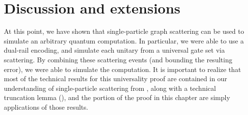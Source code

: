 \documentclass[../thesis-main/thesis-main]{subfiles}
\begin{document}
\begin{comment}
In particular, the fact that the initial state is efficiently preparable means that there exists a quantum circuit $\mathcal{C}_{\text{prep}}$ that prepares the given initial state from the state $\ket{0^n}$, possibly including some ancilla states.  Moreover, the quantum circuit only consists of $\poly(|x|)$ one- and two-qubit gates, since the state is efficiently preparable.  (Note that this bound depends on the efficiency of the given instance.)

From the initial state, we can then use \thm{Hamiltonian_simulation} to evaluate the quantum walk Hamiltonian for the time $T$.  Since the Hamiltonian is $d$-sparse, and since the Hamiltonian is an adjacency matrix, we have that its maximal eigenvalue is at most $d$.  Assuming that we want to perform the simulation with error $1/10$, we can then simulate the evolution of the quantum walk in an efficient manner.  (Again, the efficiency depends on the given instance.)

Finally, the quantum circuit can measure the state of the system in the vertex basis.  If the measured vertex belongs to $\mathcal{K}$ (a post-processing procedure that can be done efficiently), then the circuit accepts.  Otherwise, the circuit rejects.

As the quantum walker fails with probability at most $\frac{1}{3}$ (i.e., accepts the state for a yes instance with probability at least $\frac{2}{3}$, and accepts a no-instance with probability at most $\frac{1}{3}$), with the error arising from the simulation we still have that the yes and no instances of our simulations have a constant acceptance gap.  Hence, we have that \QWE{} is in \BQP.

Put together with our results using scattering, we then have that \QWE{} is \BQP-complete, or that quantum walks are universal for quantum computation.

\end{comment}

\section{Discussion and extensions}

At this point, we have shown that single-particle graph scattering can be used to simulate an arbitrary quantum computation.  In particular, we were able to use a dual-rail encoding, and simulate each unitary from a universal gate set via scattering.  By combining these scattering events (and bounding the resulting error), we were able to simulate the computation.  It is important to realize that most of the technical results for this universality proof are contained in our understanding of single-particle scattering from , along with a technical truncation lemma (), and the portion of the proof in this chapter are simply applications of those results.
\end{document}
